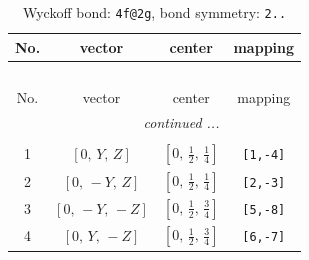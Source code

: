 \documentclass[fleqn,8pt]{jsarticle}
\begin{document}
\renewcommand{\arraystretch}{1.2}
\begin{longtable}{cccc}
\caption{Wyckoff bond: {\tt 4f@2g}, bond symmetry: {\tt 2..}}
 \\
 \hline \hline
No. & vector & center & mapping \\ \hline \endfirsthead

\multicolumn{3}{l}{\tablename\ \thetable{}} \\
 \hline \hline
No. & vector & center & mapping \\ \hline \endhead

 \hline \hline
\multicolumn{3}{r}{\footnotesize\it continued ...} \\ \endfoot

 \hline \hline
\multicolumn{3}{r}{} \\ \endlastfoot

1 & $\left[ 0,\, Y,\, Z \right]$ & $\left[ 0,\, \frac{1}{2},\, \frac{1}{4} \right]$ & {\tt [1,-4]} \\ \hline
2 & $\left[ 0,\, - Y,\, Z \right]$ & $\left[ 0,\, \frac{1}{2},\, \frac{1}{4} \right]$ & {\tt [2,-3]} \\ \hline
3 & $\left[ 0,\, - Y,\, - Z \right]$ & $\left[ 0,\, \frac{1}{2},\, \frac{3}{4} \right]$ & {\tt [5,-8]} \\ \hline
4 & $\left[ 0,\, Y,\, - Z \right]$ & $\left[ 0,\, \frac{1}{2},\, \frac{3}{4} \right]$ & {\tt [6,-7]} \\
\end{longtable}
\renewcommand{\arraystretch}{1.2}
\end{document}
